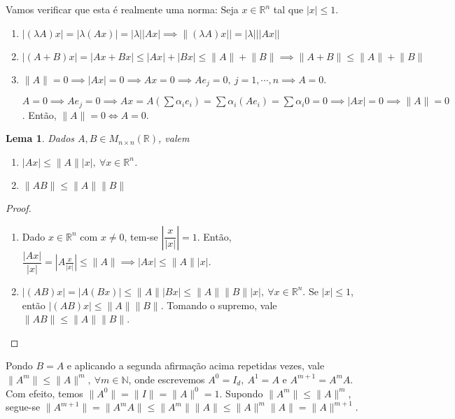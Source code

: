 \documentclass[a4paper, 12pt]{article}
\renewcommand{\Bbb}{\mathbb}
\newtheorem*{8}{Lema}
\begin{document}
Vamos verificar que esta é realmente uma norma: Seja $x \in \Bbb R^n$ tal que $|x|\leq 1$. 
\begin{enumerate}
    \item $|(\lambda A)x|=|\lambda(Ax)|=|\lambda||Ax| \implies \lVert(\lambda A)x||=|\lambda|||Ax||$
    \item $|(A+B)x|=|Ax+Bx| \leq |Ax|+|Bx| \leq \lVert A\rVert + \lVert B\rVert \implies \lVert A+B\rVert \leq \lVert A\rVert+\lVert B\rVert$
    \item $\lVert A\rVert=0 \implies |Ax|=0 \implies Ax =0 \implies Ae_j=0,\ j=1,\cdots,n \implies A=0$.
    
    $A=0 \implies Ae_j=0 \implies Ax=A(\sum\alpha_i e_i)=\sum\alpha_i(Ae_i)=\sum\alpha_i 0=0 \implies|Ax|=0 \implies \lVert A\rVert=0$. Então, $\lVert A\rVert=0 \iff A=0$.
\end{enumerate}
\begin{8}
Dados $A,B\in M_{n\times n}(\Bbb R)$, valem
\begin{enumerate}
    \item $|Ax|\leq\lVert A\rVert|x|,\ \forall x\in \Bbb R^n$.
    \item $\lVert AB\rVert\leq \lVert A \rVert \lVert B\rVert$
\end{enumerate}
\end{8}
\begin{proof}
\begin{enumerate}
    \item Dado $x\in \Bbb R^n$ com $x\neq 0$, tem-se $|\dfrac{x}{|x|}|=1$. Então, $\dfrac{|Ax|}{|x|}=|A\frac{x}{|x|}|\leq \lVert A\rVert \implies |Ax|\leq\lVert A\rVert |x|$.
    \item $|(AB)x|=|A(Bx)|\leq \lVert A\rVert |Bx| \leq \lVert A\rVert \lVert B\rVert |x|,\ \forall x\in \Bbb R^n$. Se $|x|\leq 1$, então $|(AB)x|\leq \lVert A\rVert \lVert B\rVert$. Tomando o supremo, vale $\lVert AB\rVert \leq \lVert A\rVert \lVert B\rVert$.
\end{enumerate}
\end{proof}

Pondo $B=A$ e aplicando a segunda afirmação acima repetidas vezes, vale $\lVert A^m\rVert \leq \lVert A\rVert^m,\ \forall m\in \Bbb N$, onde escrevemos $A^0=I_d,\ A^1=A$ e $A^{m+1}=A^mA$. Com efeito, temos $\lVert A^0\rVert = \lVert I\rVert = \lVert A\rVert^0=1$. Supondo $\lVert A^m\rVert \leq \lVert A\rVert^m$, segue-se $\lVert A^{m+1}\rVert=\lVert A^mA\rVert \leq \lVert A^m\rVert \lVert A\rVert \leq \lVert A\rVert^m \lVert A\rVert = \lVert A\rVert^{m+1}$.
\end{document}
